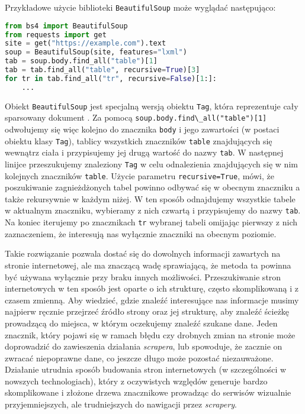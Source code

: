Przykładowe użycie biblioteki \texttt{BeautifulSoup} może wyglądać następująco:
\begin{lstlisting}[language=Python]
from bs4 import BeautifulSoup
from requests import get
site = get("https://example.com").text
soup = BeautifulSoup(site, features="lxml")
tab = soup.body.find_all("table")[1]
tab = tab.find_all("table", recursive=True)[3]
for tr in tab.find_all("tr", recursive=False)[1:]:
	...
\end{lstlisting}
Obiekt \texttt{BeautifulSoup} jest specjalną wersją obiektu \texttt{Tag}, która reprezentuje cały sparsowany dokument \cite{richardson2007beautiful}.
Za pomocą \lstinline{soup.body.find\_all("table")[1]} odwołujemy się więc kolejno do znacznika \texttt{body} i jego zawartości (w postaci obiektu klasy \texttt{Tag}),  tablicy wszystkich znaczników \texttt{table} znajdujących się wewnątrz ciała i przypisujemy jej drugą wartość do nazwy \texttt{tab}.
W następnej linijce przeszukujemy znaleziony \texttt{Tag} w celu odnalezienia znajdujących się w nim kolejnych znaczników \texttt{table}.
Użycie parametru \lstinline{recursive=True}, mówi, że poszukiwanie zagnieżdżonych tabel powinno odbywać się w obecnym znaczniku a także rekursywnie w każdym niżej.
W ten sposób odnajdujemy wszystkie tabele w aktualnym znaczniku, wybieramy z nich czwartą i przypisujemy do nazwy \texttt{tab}.
Na koniec iterujemy po znacznikach \texttt{tr} wybranej tabeli omijając pierwszy z nich zaznaczeniem, że interesują nas wyłącznie znaczniki na obecnym poziomie.

Takie rozwiązanie pozwala dostać się do dowolnych informacji zawartych na stronie internetowej, ale ma znaczącą wadę sprawiającą, że metoda ta powinna być używana wyłącznie przy braku innych możliwości.
Przeszukiwanie stron internetowych w ten sposób jest oparte o ich strukturę, często skomplikowaną i z czasem zmienną.
Aby wiedzieć, gdzie znaleźć interesujące nas informacje musimy najpierw ręcznie przejrzeć źródło strony oraz jej strukturę, aby znaleźć ścieżkę prowadzącą do miejsca, w którym oczekujemy znaleźć szukane dane.
Jeden znacznik, który pojawi się w ramach błędu czy drobnych zmian na stronie może doprowadzić do zawieszenia działania \emph{scrapera}, lub spowoduje, że zacznie on zwracać niepoprawne dane, co jeszcze długo może pozostać niezauważone.
Działanie utrudnia sposób budowania stron internetowych (w szczególności w nowszych technologiach), który z oczywistych względów generuje bardzo skomplikowane i złożone drzewa znacznikowe prowadząc do serwisów wizualnie przyjemniejszych, ale trudniejszych do nawigacji przez \emph{scrapery}.

